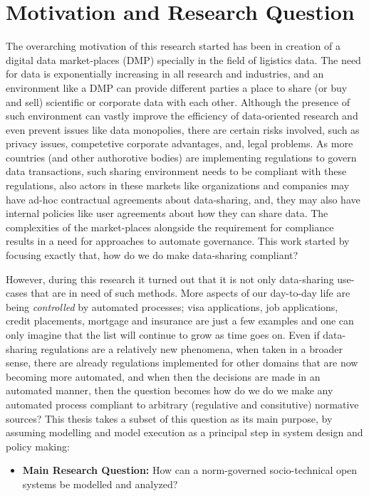 \section{Motivation and Research Question}
The overarching motivation of this research started has been in creation of a digital data market-places (DMP) specially in the field of ligistics data. The need for data is exponentially increasing in all research and industries, and an environment like a DMP can provide different parties a place to share (or buy and sell) scientific or corporate data with each other. Although the presence of such environment can vastly improve the efficiency of data-oriented research and even prevent issues like data monopolies, there are certain risks involved, such as privacy issues, competetive corporate advantages, and, legal problems. As more countries (and other authorotive bodies) are implementing regulations to govern data transactions, such sharing environment needs to be compliant with these regulations, also actors in these markets like organizations and companies may have ad-hoc contractual agreements about data-sharing, and, they may also have internal policies like user agreements about how they can share data. The complexities of the market-places alongside the requirement for compliance results in a need for approaches to automate governance. This work started by focusing exactly that, how do we do make data-sharing compliant? 

However, during this research it turned out that it is not only data-sharing use-cases that are in need of such methods. More aspects of our day-to-day life are being \textit{controlled} by automated processes; visa applications, job applications, credit placements, mortgage and insurance are just a few examples and one can only imagine that the list will continue to grow as time goes on. Even if data-sharing regulations are a relatively new phenomena, when taken in a broader sense, there are already regulations implemented for other domains that are now becoming more automated, and when then the decisions are made in an automated manner, then the question becomes how do we do we make any automated process compliant to arbitrary (regulative and consitutive) normative sources? This thesis takes a subset of this question as its main purpose, by assuming modelling and model execution as a principal step in system design and policy making:

\begin{itemize}
    \item \textbf{Main Research Question:} How can a norm-governed socio-technical open systems be modelled and analyzed?
\end{itemize}


